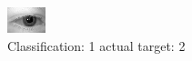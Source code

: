 \begin{figure}[h!]
\begin{center}
\includegraphics[width=0.60\columnwidth]{figures/ID466_class_1_target_2.png}
\end{center}
\caption{ Classification: 1 actual target: 2}
\label{fig:ID466_class_1_target_2}
\end{figure}
